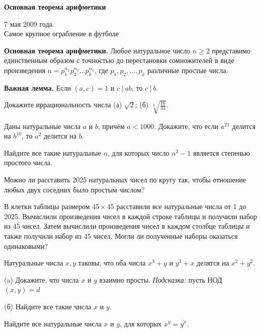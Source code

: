 \centerline{\bf \Huge Основная теорема арифметики}


\begin{flushright}
        \scriptsize{7 мая 2009 года.\\ Самое крупное ограбление в футболе}
\end{flushright}

\textbf{Основная теорема арифметики.} Любое натуральное число $n \geq 2$ представимо единственным образом с точностью до перестановки сомножителей в виде произведения $n=p_1^{\alpha_1} p_2^{\alpha_2} \ldots p_k^{\alpha_k}$, где $p_1, p_2, \ldots, p_k$ различные простые числа.

\noindent
\textbf{Важная лемма.} Если $(a,c)=1$ и $c\ |\ ab$, то $c\ | \ b$. 

Докажите иррациональность числа (а) $\sqrt{2}$; (б) $\sqrt[3]{\frac{16}{33}}$.

Даны натуральные числа $a$ и $b$, причём $a<1000$. Докажите, что если $a^{21}$ делится на $b^{10}$, то $a^2$ делится на $b$.

Найдите все такие натуральные $n$, для которых число $n^2-1$ является степенью простого числа.

Можно ли расставить 2025 натуральных чисел по кругу так, чтобы отношение любых двух соседних было простым числом?

В клетки таблицы размером $45 \times 45$ расставили все натуральные числа от 1 до 2025. Вычислили произведения чисел в каждой строке таблицы и получили набор из 45 чисел. Затем вычислили произведения чисел в каждом столбце таблицы и также получили набор из 45 чисел. Могли ли полученные наборы оказаться одинаковыми?

Натуральные числа $x, y$ таковы, что оба числа $x^3+y$ и $y^3+x$ делятся на $x^2+y^2$.

(a) Докажите, что числа $x$ и $y$ взаимно просты. \textit{Подсказка:} пусть НОД$(x,y) = d$

(б) Найдите все такие числа $x$ и $y$.

Найдите все натуральные числа $x$ и $y$, для которых $x^y=y^x$.
